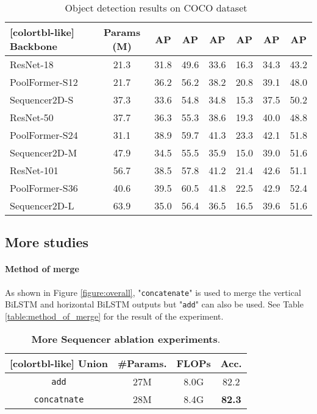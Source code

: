 \documentclass{article}
\begin{document}
\begin{table}[!htp]\centering
\caption{Object detection results on COCO dataset~\cite{lin2014microsoft}}\label{table:detection}
\small
\setlength\tabcolsep{2.36pt}
\begin{NiceTabular}{lccccccc}[colortbl-like]
Backbone & Params (M) &AP &AP &AP &AP &AP &AP \\ \hline
ResNet-18~\cite{he2016deep} &21.3 &31.8 &49.6 &33.6 &16.3 &34.3 &43.2 \\
PoolFormer-S12~\cite{yu2021metaformer} &21.7 &36.2 &56.2 &38.2 &20.8 &39.1 &48.0 \\
Sequencer2D-S &37.3 &33.6 &54.8 &34.8 &15.3 &37.5 &50.2 \\
ResNet-50~\cite{he2016deep} &37.7 &36.3 &55.3 &38.6 &19.3 &40.0 &48.8 \\
PoolFormer-S24~\cite{yu2021metaformer} &31.1 &38.9 &59.7 &41.3 &23.3 &42.1 &51.8 \\
Sequencer2D-M &47.9 &34.5 &55.5 &35.9 &15.0 &39.0 &51.6 \\
ResNet-101~\cite{he2016deep} &56.7 &38.5 &57.8 &41.2 &21.4 &42.6 &51.1 \\
PoolFormer-S36~\cite{yu2021metaformer} &40.6 &39.5 &60.5 &41.8 &22.5 &42.9 &52.4 \\
Sequencer2D-L &63.9 &35.0 &56.4 &36.5 &16.5 &39.6 &51.6 \\
\end{NiceTabular}
\end{table}

\subsection{More studies}
\label{subsec:more_studies}

\paragraph{Method of merge}
As shown in Figure \ref{figure:overall}, "\texttt{concatenate}" is used to merge the vertical BiLSTM and horizontal BiLSTM outputs but "\texttt{add}" can also be used. See Table \ref{table:method_of_merge} for the result of the experiment.

\begin{table}[tb]
\small
\centering
\caption{\textbf{More Sequencer ablation experiments}.}
\begin{minipage}[t]{0.45\linewidth}{
\begin{center}
\begin{NiceTabular}{cccc}[colortbl-like]
Union & \#Params. & FLOPs & Acc. \\
\hline
\texttt{add} & 27M & 8.0G & 82.2 \\
\texttt{concatnate} & 28M & 8.4G & \textbf{82.3} \\
\end{NiceTabular}
\end{center}
}\end{minipage}
\label{table:more_studies}
\end{table}
\end{document}
